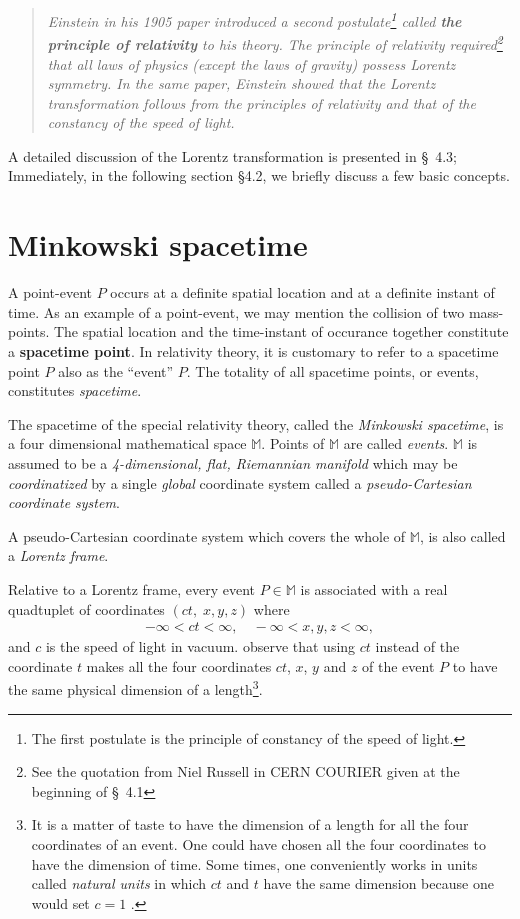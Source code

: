 \begin{small}
\begin{quote}
\textsl{Einstein in his 1905 paper introduced a second 
postulate\footnote{The first postulate is the principle 
of constancy of the speed of light.} called  \textbf{the 
principle of relativity} to his theory.  The 
principle of relativity required\footnote{See the quotation 
from Niel Russell 
in CERN COURIER given at the beginning of \S~4.1} that  all 
laws of physics (except the laws of gravity) possess 
\textsl{Lorentz symmetry}.  In the same paper, Einstein 
showed that the Lorentz transformation follows from the 
principles of relativity and that of the constancy of the 
speed of light.}
\end{quote}
A detailed discussion of the Lorentz transformation is 
presented in \S~4.3; Immediately, in the following section 
\S4.2, we briefly discuss a few basic concepts.

\vspace{-.2cm}

\section{Minkowski spacetime}
 A point-event $P$ occurs at a definite 
spatial location and at a definite instant of 
time. As an example of a point-event, we may mention the 
collision of two mass-points. The spatial location and the 
time-instant of occurance together constitute a 
\textbf{spacetime point}. In relativity theory, it is 
customary to refer to a spacetime point $P$ also as the 
``event'' $P$. The totality of all spacetime points, or 
events, constitutes \textsl{spacetime}. 

 The spacetime of the special 
relativity theory, called the \textsl{Minkowski spacetime}, 
is a four dimensional mathematical space $\mathbb{M}$. 
Points of $\mathbb{M}$ are called \textsl{events}. 
$\mathbb{M}$ is assumed to be a \textsl{4-dimensional, flat, 
Riemannian  manifold}  which may be \textsl{coordinatized} 
by a single \textsl{global} coordinate system called a 
\textsl{pseudo-Cartesian coordinate system}. 

A pseudo-Cartesian coordinate system 
which covers the whole of $\mathbb{M}$, is also called  a 
\textsl{Lorentz frame}.  

\newpage

Relative to a Lorentz frame, every event $P\in \mathbb{M}$ 
is associated with a real quadtuplet of coordinates  
$(ct,\;x,y,z)$ where 
\begin{align*} 
-\infty<ct<\infty,   \quad -\infty< x, y, z<\infty,   
\end{align*} 
and $c$ is the speed of light in vacuum. observe that using 
$ct$ instead of the coordinate  $t$  makes all the four 
coordinates $ct$, $x$, $y$ and $z$ of the event $P$ to have 
the same physical dimension of a length\footnote{It is a 
matter of taste to have the dimension of a length for all 
the four coordinates of an event. One could have chosen all 
the four coordinates to have the dimension of time. Some 
times, one conveniently works in units called 
\textsl{natural units} in which $ct$ and 
$t$ have the same dimension because one would set  $c = 1$ 
.}. 


\end{small}
